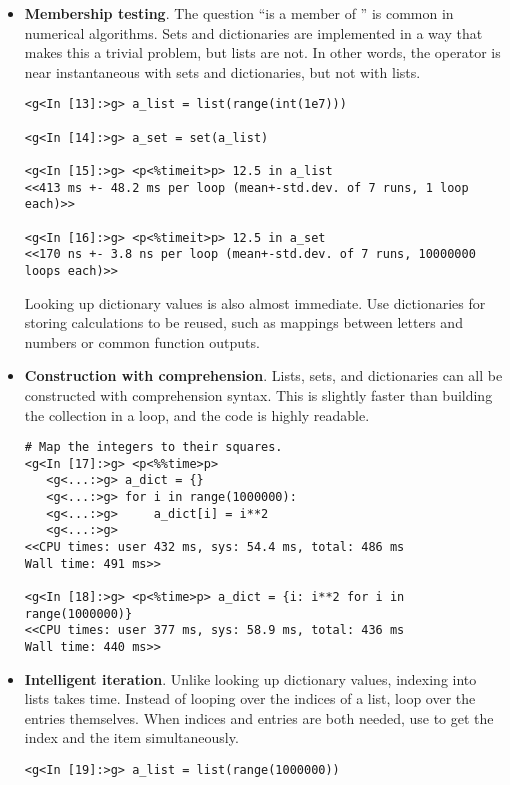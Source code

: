 \begin{itemize}
\item \textbf{Membership testing}. The question ``is  a member of '' is common in numerical algorithms.
Sets and dictionaries are implemented in a way that makes this a trivial problem, but lists are not.
In other words, the  operator is near instantaneous with sets and dictionaries, but not with lists.

\begin{lstlisting}
<g<In [13]:>g> a_list = list(range(int(1e7)))

<g<In [14]:>g> a_set = set(a_list)

<g<In [15]:>g> <p<%timeit>p> 12.5 in a_list
<<413 ms +- 48.2 ms per loop (mean+-std.dev. of 7 runs, 1 loop each)>>

<g<In [16]:>g> <p<%timeit>p> 12.5 in a_set
<<170 ns +- 3.8 ns per loop (mean+-std.dev. of 7 runs, 10000000 loops each)>>
\end{lstlisting}

Looking up dictionary values is also almost immediate.
Use dictionaries for storing calculations to be reused, such as mappings between letters and numbers or common function outputs.

\item \textbf{Construction with comprehension}.
Lists, sets, and dictionaries can all be constructed with comprehension syntax.
This is slightly faster than building the collection in a loop, and the code is highly readable.

\begin{lstlisting}
# Map the integers to their squares.
<g<In [17]:>g> <p<%%time>p>
   <g<...:>g> a_dict = {}
   <g<...:>g> for i in range(1000000):
   <g<...:>g>     a_dict[i] = i**2
   <g<...:>g>
<<CPU times: user 432 ms, sys: 54.4 ms, total: 486 ms
Wall time: 491 ms>>

<g<In [18]:>g> <p<%time>p> a_dict = {i: i**2 for i in range(1000000)}
<<CPU times: user 377 ms, sys: 58.9 ms, total: 436 ms
Wall time: 440 ms>>
\end{lstlisting}

\item \textbf{Intelligent iteration}.
Unlike looking up dictionary values, indexing into lists takes time.
Instead of looping over the indices of a list, loop over the entries themselves.
When indices and entries are both needed, use  to get the index and the item simultaneously.

\begin{lstlisting}
<g<In [19]:>g> a_list = list(range(1000000))


\end{lstlisting}
\end{itemize}
